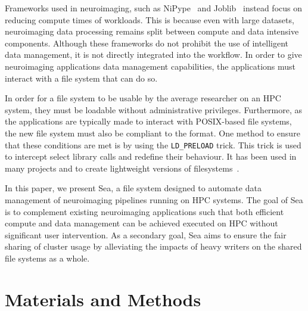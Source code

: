     Frameworks used in neuroimaging, such as NiPype~\cite{nipype} and Joblib~\cite{joblib} instead focus on reducing compute times of workloads.
    This is because even with large datasets, neuroimaging data processing remains split between compute and data
    intensive components. Although these frameworks do not prohibit the use of intelligent data management, it is not directly integrated
    into the workflow. In order to give neuroimaging applications data management capabilities, the applications must interact with a
    file system that can do so.
    
    In order for a file system to be usable by the average researcher on an HPC system, they must be loadable without administrative
    privileges. Furthermore, as the applications are typically made to interact with POSIX-based file systems, the new file system must
    also be compliant to the format. One method to ensure that these conditions are met is by using the \texttt{LD\_PRELOAD} trick. This trick is
    used to intercept select library calls and redefine their behaviour. It has been used in many projects and to create lightweight versions
    of filesystems~\cite{xtreemfs}. 
    
    In this paper, we present Sea, a file system designed to automate data management of neuroimaging pipelines running on HPC systems.
    The goal of Sea is to complement existing neuroimaging applications such that both efficient compute and data management can be achieved
    executed on HPC without significant user intervention. As a secondary goal, Sea aims to ensure the fair sharing of cluster usage
    by alleviating the impacts of heavy writers on the shared file systems as a whole. 
    
    
    
    
    
    
    \section{Materials and Methods}
    
